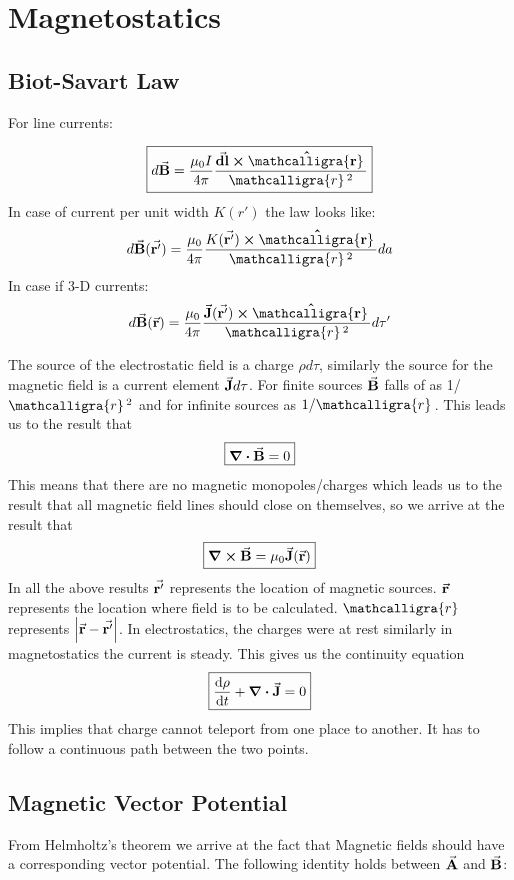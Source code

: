 \documentclass[12pt, oneside]{book}
\newcommand{\scriptr}{\mathcalligra{r}\,}
\begin{document}
\chapter{Magnetostatics}
\section{Biot-Savart Law}
For line currents:

\begin{equation}
	\boxed{
	d\va{B}=\frac{\mu_0 I}{4\pi}\dfrac{\va{dl}\cross\vu{\scriptr}}{\scriptr^2}}
\end{equation}
In case of current per unit width $K(r')$ the law looks like:
\begin{equation}
	d\va{B}(\va{r'})=\frac{\mu_0}{4\pi}\dfrac{K(\va{r'})\cross\vu{\scriptr}}{\scriptr^2}da
\end{equation}
In case if 3-D currents:
\begin{equation}
	d\va{B}(\va{r})=\frac{\mu_0}{4\pi}\dfrac{\va{J}(\va{r'})\cross\vu{\scriptr}}{\scriptr^2}d\tau'
\end{equation}

The source of the electrostatic field is a charge $\rho d\tau$, similarly the source for the magnetic field is a current element $\va{J}d\tau$. For finite sources $\va{B}$ falls of as 1/$\scriptr^2$ and for infinite sources as $1/\scriptr$. This leads us to the result that 
\begin{equation}
      \boxed{\div{\va{B}}=0}
\end{equation}
This means that there are no magnetic monopoles/charges which leads us to the result that all magnetic field lines should close on themselves, so we arrive at the result that
\begin{equation}
\boxed{	\curl{\va{B}}=\mu_0 \va{J}(\va{r})}
\end{equation}
In all the above results $\va{r'}$ represents the location of magnetic sources. $\va{r}$ represents the location where field is to be calculated. $\scriptr$ represents $\abs{\va{r}-\va{r'}}$. In electrostatics, the charges were at rest similarly in magnetostatics the current is steady. This gives us the continuity equation
\begin{equation}
	\boxed{\dv{\rho}{t}+\div{\va{J}}=0}
\end{equation}
This implies that charge cannot teleport from one place to another. It has to follow a continuous path between the two points. 
\section{Magnetic Vector Potential}
From Helmholtz's theorem we arrive at the fact that Magnetic fields should have a corresponding vector potential. The following identity holds between $\va{A}$ and $\va{B}$:
\end{document}
